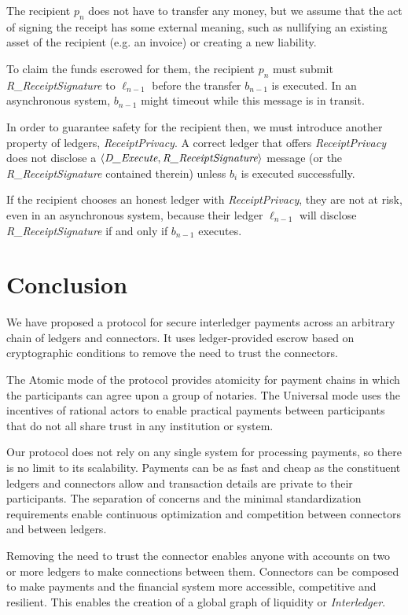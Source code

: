\documentclass[letterpaper,twocolumn,10pt]{article}
\begin{document}
The recipient $p_n$ does not have to transfer any money, but we assume that the act of signing the receipt has some external meaning, such as nullifying an existing asset of the recipient (e.g. an invoice) or creating a new liability.

To claim the funds escrowed for them, the recipient $p_n$ must submit \textit{R\_ReceiptSignature} to $\ell_{n-1}$ before the transfer $b_{n-1}$ is executed. In an asynchronous system, $b_{n-1}$ might timeout while this message is in transit.

In order to guarantee safety for the recipient then, we must introduce another property of ledgers, \textit{ReceiptPrivacy}. A correct ledger that offers \textit{ReceiptPrivacy} does not disclose a $\langle \textit{D\_Execute}, \textit{R\_ReceiptSignature} \rangle$ message (or the \textit{R\_ReceiptSignature} contained therein) unless $b_i$ is executed successfully.

If the recipient chooses an honest ledger with \textit{ReceiptPrivacy}, they are not at risk, even in an asynchronous system, because their ledger $\ell_{n-1}$ will disclose \textit{R\_ReceiptSignature} if and only if $b_{n-1}$ executes.


\section{Conclusion}

We have proposed a protocol for secure interledger payments across an arbitrary chain of ledgers and connectors. It uses ledger-provided escrow based on cryptographic conditions to remove the need to trust the connectors.

The Atomic mode of the protocol provides atomicity for payment chains in which the participants can agree upon a group of notaries. The Universal mode uses the incentives of rational actors to enable practical payments between participants that do not all share trust in any institution or system.

Our protocol does not rely on any single system for processing payments, so there is no limit to its scalability. Payments can be as fast and cheap as the constituent ledgers and connectors allow and transaction details are private to their participants. The separation of concerns and the minimal standardization requirements enable continuous optimization and competition between connectors and between ledgers.

Removing the need to trust the connector enables anyone with accounts on two or more ledgers to make connections between them. Connectors can be composed to make payments and the financial system more accessible, competitive and resilient. This enables the creation of a global graph of liquidity or \textit{Interledger}.
\end{document}
